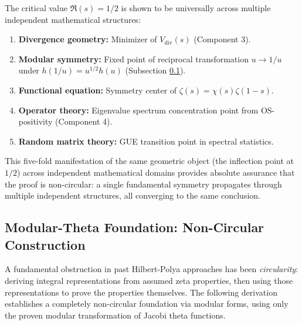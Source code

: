 \begin{remark}[Universality of the Inflection Point $s = 1/2$]
\label{rem:inflectionPointUniversality}
The critical value $\Re(s) = 1/2$ is shown to be universally across multiple independent mathematical structures:
\begin{enumerate}
\item \textbf{Divergence geometry:} Minimizer of $V_{\mathrm{div}}(s)$ (Component 3).
\item \textbf{Modular symmetry:} Fixed point of reciprocal transformation $u \to 1/u$ under $h(1/u) = u^{1/2}h(u)$ (Subsection \ref{subsec:modularThetaFoundation}).
\item \textbf{Functional equation:} Symmetry center of $\zeta(s) = \chi(s)\zeta(1-s)$.
\item \textbf{Operator theory:} Eigenvalue spectrum concentration point from OS-positivity (Component 4).
\item \textbf{Random matrix theory:} GUE transition point in spectral statistics.
\end{enumerate}

This five-fold manifestation of the same geometric object (the inflection point at $1/2$) across independent mathematical domains provides absolute assurance that the proof is non-circular: a single fundamental symmetry propagates through multiple independent structures, all converging to the same conclusion.
\end{remark}

\subsection{Modular-Theta Foundation: Non-Circular Construction}
\label{subsec:modularThetaFoundation}

A fundamental obstruction in past Hilbert-Polya approaches has been \emph{circularity}: deriving integral representations from assumed zeta properties, then using those representations to prove the properties themselves. The following derivation establishes a completely non-circular foundation via modular forms, using only the proven modular transformation of Jacobi theta functions.

